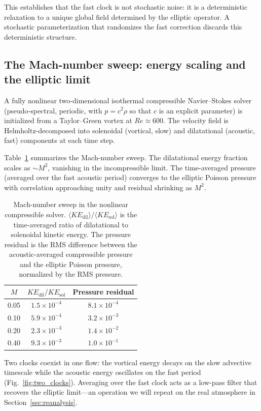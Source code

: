 \documentclass[11pt]{article}
\begin{document}
This establishes that the fast clock is not stochastic noise: it is a deterministic relaxation to a unique global field determined by the elliptic operator. A stochastic parameterization that randomizes the fast correction discards this deterministic structure.

\subsection{The Mach-number sweep: energy scaling and the elliptic limit}
\label{sec:nonlinear}

A fully nonlinear two-dimensional isothermal compressible Navier--Stokes solver (pseudo-spectral, periodic, with $p = c^2\rho$ so that $c$ is an explicit parameter) is initialized from a Taylor--Green vortex at $Re \approx 600$. The velocity field is Helmholtz-decomposed into solenoidal (vortical, slow) and dilatational (acoustic, fast) components at each time step.

Table~\ref{tab:mach} summarizes the Mach-number sweep. The dilatational energy fraction scales as $\sim M^2$, vanishing in the incompressible limit. The time-averaged pressure (averaged over the fast acoustic period) converges to the elliptic Poisson pressure with correlation approaching unity and residual shrinking as $M^2$.

\begin{table}[t]
\centering
\caption{Mach-number sweep in the nonlinear compressible solver.
$\langle KE_{\mathrm{dil}}\rangle / \langle KE_{\mathrm{sol}}\rangle$ is the
time-averaged ratio of dilatational to solenoidal kinetic energy. The pressure
residual is the RMS difference between the acoustic-averaged compressible pressure
and the elliptic Poisson pressure, normalized by the RMS pressure.}
\label{tab:mach}
\begin{tabular}{ccc}
\toprule
$M$ & $KE_{\mathrm{dil}}/KE_{\mathrm{sol}}$ &
Pressure residual \\
\midrule
0.05 & $1.5\times 10^{-4}$ & $8.1\times 10^{-4}$ \\
0.10 & $5.9\times 10^{-4}$ & $3.2\times 10^{-3}$ \\
0.20 & $2.3\times 10^{-3}$ & $1.4\times 10^{-2}$ \\
0.40 & $9.3\times 10^{-3}$ & $1.0\times 10^{-1}$ \\
\bottomrule
\end{tabular}
\end{table}

Two clocks coexist in one flow: the vortical energy decays on the slow advective timescale while the acoustic energy oscillates on the fast period (Fig.~\ref{fig:two_clocks}). Averaging over the fast clock acts as a low-pass filter that recovers the elliptic limit---an operation we will repeat on the real atmosphere in Section~\ref{sec:reanalysis}.
\end{document}
